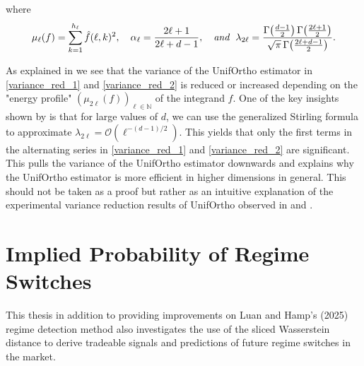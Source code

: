 \documentclass[12pt,a4paper]{report}
\begin{document}
where 
$$
\mu_{\ell}(f) = \sum_{k=1}^{h_{\ell}} \hat{f}(\ell, k)^2, \quad
\alpha_{\ell} = \frac{2\ell + 1}{2\ell + d - 1}, \quad \emph{and } \;
\lambda_{2\ell} = \frac{\Gamma\!\left(\frac{d-1}{2}\right)\Gamma\!\left(\frac{2\ell+1}{2}\right)}{\sqrt{\pi}\,\Gamma\!\left(\frac{2\ell+d-1}{2}\right)}.
$$
\cite{PetrovicBardenetDesolneux2025}

As explained in \cite{PetrovicBardenetDesolneux2025} we see that the variance of the UnifOrtho estimator in \ref{variance_red_1} and \ref{variance_red_2} is reduced or increased depending on the "energy profile" $\left(\mu_{2\ell}(f)\right)_{\ell \in \mathbb{N}}$ of the integrand $f$. 
One of the key insights shown by \cite{PetrovicBardenetDesolneux2025} is that for large values of  $d$, we can use the generalized Stirling formula to approximate $\lambda_{2\ell} = \mathcal{O}(\ell^{-(d-1)/2})$. 
This yields that only the first terms in the alternating series in \ref{variance_red_1} and \ref{variance_red_2} are significant. This pulls the variance of the UnifOrtho estimator downwards and explains why the UnifOrtho estimator is more efficient in higher dimensions in general.
This should not be taken as a proof but rather as an intuitive explanation of the experimental variance reduction results of UnifOrtho observed in \cite{RowlandEtAl2019} and \cite{PetrovicBardenetDesolneux2025}.

\section{Implied Probability of Regime Switches} \label{sec:implied_prob}
This thesis in addition to providing improvements on Luan and Hamp's (2025) \cite{LuanHamp2025} regime detection method also investigates the use of the sliced Wasserstein distance to derive tradeable signals and predictions of
future regime switches in the market.
\end{document}
